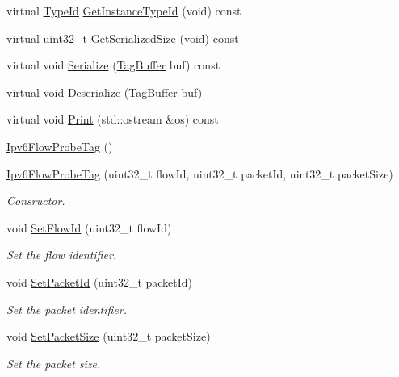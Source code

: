\begin{DoxyCompactItemize}
\item 
virtual \hyperlink{classns3_1_1TypeId}{Type\+Id} \hyperlink{classns3_1_1Ipv6FlowProbeTag_a23fdfffaa0f4e4fbc0c101793383e6d3}{Get\+Instance\+Type\+Id} (void) const 
\item 
virtual uint32\+\_\+t \hyperlink{classns3_1_1Ipv6FlowProbeTag_ad91d24cd49c34e7dc4150046ea98d8d2}{Get\+Serialized\+Size} (void) const 
\item 
virtual void \hyperlink{classns3_1_1Ipv6FlowProbeTag_ad57480de6ebda4ee62569a5fd59581cb}{Serialize} (\hyperlink{classns3_1_1TagBuffer}{Tag\+Buffer} buf) const 
\item 
virtual void \hyperlink{classns3_1_1Ipv6FlowProbeTag_acfa330d5924d362c38e0f3fdfc33b84b}{Deserialize} (\hyperlink{classns3_1_1TagBuffer}{Tag\+Buffer} buf)
\item 
virtual void \hyperlink{classns3_1_1Ipv6FlowProbeTag_a2bc8c9e9ac5f24c16e7e207271460d27}{Print} (std\+::ostream \&os) const 
\item 
\hyperlink{classns3_1_1Ipv6FlowProbeTag_a2cbbaac6c95b631747030eac1f0b7ecf}{Ipv6\+Flow\+Probe\+Tag} ()
\item 
\hyperlink{classns3_1_1Ipv6FlowProbeTag_ab0aba294d9662e81a20a2a1018290c04}{Ipv6\+Flow\+Probe\+Tag} (uint32\+\_\+t flow\+Id, uint32\+\_\+t packet\+Id, uint32\+\_\+t packet\+Size)
\begin{DoxyCompactList}\small\item\em Consructor. \end{DoxyCompactList}\item 
void \hyperlink{classns3_1_1Ipv6FlowProbeTag_a26e80a6fb0077145c62014118158b322}{Set\+Flow\+Id} (uint32\+\_\+t flow\+Id)
\begin{DoxyCompactList}\small\item\em Set the flow identifier. \end{DoxyCompactList}\item 
void \hyperlink{classns3_1_1Ipv6FlowProbeTag_a432ac92fefcffd1d5baa6700e4198cbf}{Set\+Packet\+Id} (uint32\+\_\+t packet\+Id)
\begin{DoxyCompactList}\small\item\em Set the packet identifier. \end{DoxyCompactList}\item 
void \hyperlink{classns3_1_1Ipv6FlowProbeTag_a7c4a58a78fcabb432141ca8ba9a714f7}{Set\+Packet\+Size} (uint32\+\_\+t packet\+Size)
\begin{DoxyCompactList}\small\item\em Set the packet size. \end{DoxyCompactList}\item 

\end{DoxyCompactItemize}
